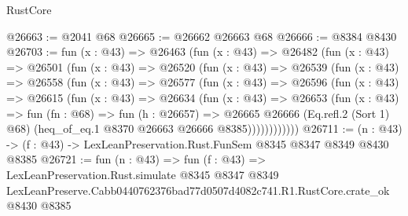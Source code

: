\begin{lexlean}{RustCore}
\begin{coremodule}
@26663 := @2041 @68
@26665 := @26662 @26663 @68
@26666 := @8384 @8430
@26703 := fun (x : @43) =>
  @26463
    (fun (x : @43) =>
    @26482
      (fun (x : @43) =>
      @26501
        (fun (x : @43) =>
        @26520
          (fun (x : @43) =>
          @26539
            (fun (x : @43) =>
            @26558
              (fun (x : @43) =>
              @26577
                (fun (x : @43) =>
                @26596
                  (fun (x : @43) =>
                  @26615
                    (fun (x : @43) =>
                    @26634
                      (fun (x : @43) =>
                      @26653
                        (fun (x : @43) =>
                        fun (fn : @68) =>
                        fun (h : @26657) =>
                        @26665
                          @26666
                          (Eq.refl.{2} (Sort 1) @68)
                          (heq_of_eq.{1} @8370 @26663 @26666 @8385))))))))))))
@26711 := (n : @43) -> (f : @43) -> LexLeanPreservation.Rust.FunSem @8345 @8347 @8349 @8430 @8385
@26721 := fun (n : @43) =>
  fun (f : @43) =>
  LexLeanPreservation.Rust.simulate
    @8345
    @8347
    @8349
    LexLeanPreserve.Cabb0440762376bad77d0507d4082c741.R1.RustCore.crate_ok
    @8430
    @8385
\end{coremodule}
\end{lexlean}
